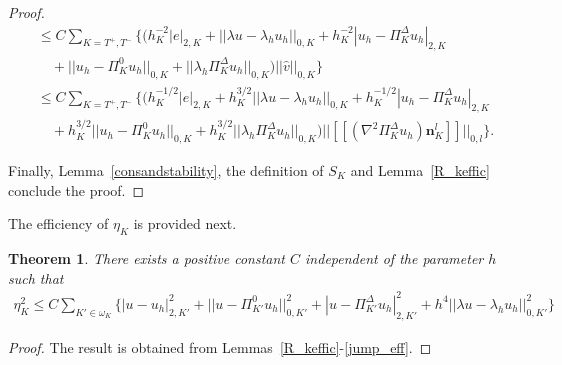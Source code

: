 \documentclass[final,reqno]{elsarticle}
\newtheorem{theorem}{Theorem}[section]
\def\PiK{\Pi_{K}^{\Delta}}
\begin{document}
\begin{proof}
\begin{align*}
&\leq C \sum\limits_{K=T^+,T^-}\Bigg\{\Big( h_K^{-2}|e|_{2,K} + ||\lambda u -\lambda_h u_h ||_{0,K}  + h_K^{-2}|u_h-\PiK u_h|_{2,K} 
\nonumber\\
&\quad +||u_h-\Pi_K^0 u_h ||_{0,K} + ||\lambda_h \PiK u_h ||_{0,K} \Big) ||\hat{v}||_{0,K}\Bigg\}\nonumber\\
&\leq C \sum\limits_{K=T^+,T^-}\Bigg\{\Big( h_K^{-1/2}|e|_{2,K} + h_K^{3/2}||\lambda u -\lambda_h u_h ||_{0,K}  + h_K^{-1/2}|u_h-\PiK u_h|_{2,K} 
\nonumber\\
&\quad +h_K^{3/2}||u_h-\Pi_K^0 u_h ||_{0,K} + h_K^{3/2}||\lambda_h \PiK u_h ||_{0,K} \Big) || [\![(\nabla^2\PiK u_h )\boldsymbol{n}_K^{l}]\!]||_{0,l}\Bigg\}.
\end{align*}

Finally, Lemma~\ref{consandstability}, the definition of $S_K$ and Lemma~\ref{R_keffic} conclude the proof.
\end{proof}

The efficiency of $\eta_K$ is provided next.
\begin{theorem}\label{local_eff}
	There exists a positive constant $C$ independent of the parameter $h$ such that
	\begin{align*}
		\eta_K^2\leq C\sum\limits_{K'\in \omega_{K}} \Big\{ |u-u_h|_{2,K'}^2+||u-\Pi_{K'}^{0}u_h||_{0,K'}^2+|u-\Pi_{K'}^{\Delta}u_h|_{2,K'}^2+h^4||\lambda u-\lambda_h u_h ||_{0,K'}^2\Big\}  
	\end{align*}
\end{theorem}
\begin{proof}
	The result is obtained from Lemmas~\ref{R_keffic}-\ref{jump_eff}.
\end{proof}
\end{document}
